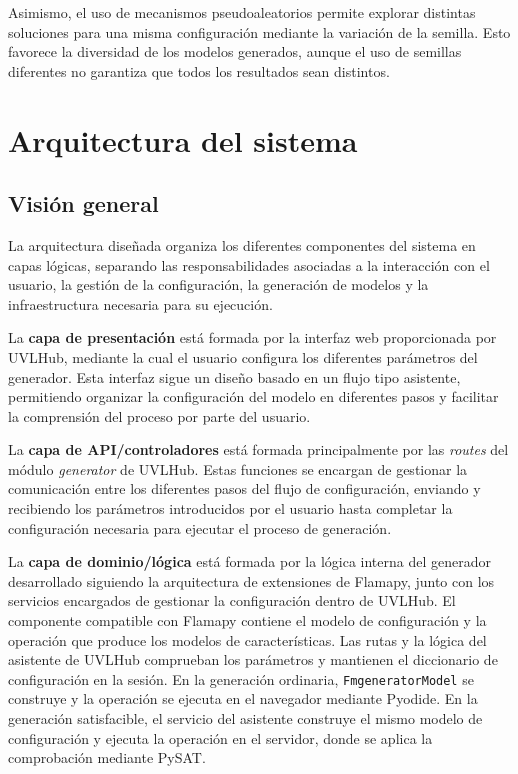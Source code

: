 Asimismo, el uso de mecanismos pseudoaleatorios permite explorar distintas soluciones para una misma configuración mediante la variación de la semilla. Esto favorece la diversidad de los modelos generados, aunque el uso de semillas diferentes no garantiza que todos los resultados sean distintos.

\section{Arquitectura del sistema}
\label{sec:arquitectura}

\subsection{Visión general}
\label{subsec:arquitectura_general}



La arquitectura diseñada organiza los diferentes componentes del sistema en capas lógicas, separando las responsabilidades asociadas a la interacción con el usuario, la gestión de la configuración, la generación de modelos y la infraestructura necesaria para su ejecución.

La \textbf{capa de presentación} está formada por la interfaz web proporcionada por UVLHub, mediante la cual el usuario configura los diferentes parámetros del generador. Esta interfaz sigue un diseño basado en un flujo tipo asistente, permitiendo organizar la configuración del modelo en diferentes pasos y facilitar la comprensión del proceso por parte del usuario.

La \textbf{capa de API/controladores} está formada principalmente por las \textit{routes} del módulo \textit{generator} de UVLHub. Estas funciones se encargan de gestionar la comunicación entre los diferentes pasos del flujo de configuración, enviando y recibiendo los parámetros introducidos por el usuario hasta completar la configuración necesaria para ejecutar el proceso de generación.

La \textbf{capa de dominio/lógica} está formada por la lógica interna del generador desarrollado siguiendo la arquitectura de extensiones de Flamapy, junto con los servicios encargados de gestionar la configuración dentro de UVLHub. El componente compatible con Flamapy contiene el modelo de configuración y la operación que produce los modelos de características. Las rutas y la lógica del asistente de UVLHub comprueban los parámetros y mantienen el diccionario de configuración en la sesión. En la generación ordinaria, \texttt{FmgeneratorModel} se construye y la operación se ejecuta en el navegador mediante Pyodide. En la generación satisfacible, el servicio del asistente construye el mismo modelo de configuración y ejecuta la operación en el servidor, donde se aplica la comprobación mediante PySAT.


